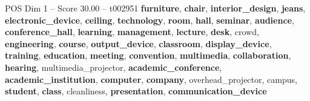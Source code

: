 \begin{textsample}{POS Dim 1 – Score 30.00 – t002951}  \label{ex:f1_pos_014}
\textbf{furniture}, \textbf{chair}, \textbf{interior\_design}, \textbf{jeans}, \textbf{electronic\_device}, \textbf{ceiling}, \textbf{technology}, \textbf{room}, \textbf{hall}, \textbf{seminar}, \textbf{audience}, \textbf{conference\_hall}, \textbf{learning}, \textbf{management}, \textbf{lecture}, \textbf{desk}, crowd, \textbf{engineering}, \textbf{course}, \textbf{output\_device}, \textbf{classroom}, \textbf{display\_device}, \textbf{training}, \textbf{education}, \textbf{meeting}, \textbf{convention}, \textbf{multimedia}, \textbf{collaboration}, \textbf{hearing}, multimedia\_projector, \textbf{academic\_conference}, \textbf{academic\_institution}, \textbf{computer}, \textbf{company}, overhead\_projector, campus, \textbf{student}, \textbf{class}, cleanliness, \textbf{presentation}, \textbf{communication\_device}

\end{textsample}
